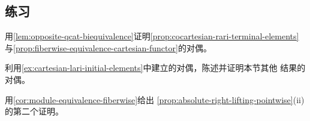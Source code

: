 \subsection*{练习}

\begin{exercise}\label{ex:cartesian-lari-initial-elements}
用\cref{lem:opposite-qcat-biequivalence}证明\cref{prop:cocartesian-rari-terminal-elements}
与\cref{prop:fiberwise-equivalence-cartesian-functor}的对偶。
\end{exercise}

\begin{exercise}\label{ex:duals-other-results}
利用\cref{ex:cartesian-lari-initial-elements}中建立的对偶，陈述并证明本节其他
结果的对偶。
\end{exercise}

\begin{exercise}\label{ex:second-proof-absolute-right-lifting}
用\cref{cor:module-equivalence-fiberwise}给出%
\cref{prop:absolute-right-lifting-pointwise}(ii) 的第二个证明。
\end{exercise}


